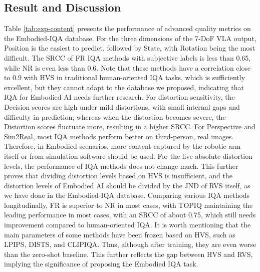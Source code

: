 \documentclass{article}
\begin{document}
\subsection{Result and Discussion}

Table \ref{tab:exp-content} presents the performance of advanced quality metrics on the Embodied-IQA database.
For the three dimensions of the 7-DoF VLA output, Position is the easiest to predict, followed by State, with Rotation being the most difficult. The SRCC of FR IQA methods with subjective labels is less than 0.65, while NR is even less than 0.6. Note that these methods have a correlation close to 0.9 with HVS in traditional human-oriented IQA tasks, which is sufficiently excellent, but they cannot adapt to the database we proposed, indicating that IQA for Embodied AI needs further research. For distortion sensitivity, the Decision scores are high under mild distortions, with small internal gaps and difficulty in prediction; whereas when the distortion becomes severe, the Distortion scores fluctuate more, resulting in a higher SRCC. For Perspective and Sim2Real, most IQA methods perform better on third-person, real images. Therefore, in Embodied scenarios, more content captured by the robotic arm itself or from simulation software should be used. For the five absolute distortion levels, the performance of IQA methods does not change much. This further proves that dividing distortion levels based on HVS is insufficient, and the distortion levels of Embodied AI should be divided by the JND of RVS itself, as we have done in the Embodied-IQA database. Comparing various IQA methods longitudinally, FR is superior to NR in most cases, with TOPIQ maintaining the leading performance in most cases, with an SRCC of about 0.75, which still needs improvement compared to human-oriented IQA. It is worth mentioning that the main parameters of some methods have been frozen based on HVS, such as LPIPS, DISTS, and CLIPIQA. Thus, although after training, they are even worse than the zero-shot baseline. This further reflects the gap between HVS and RVS, implying the significance of proposing the Embodied IQA task.
\end{document}
